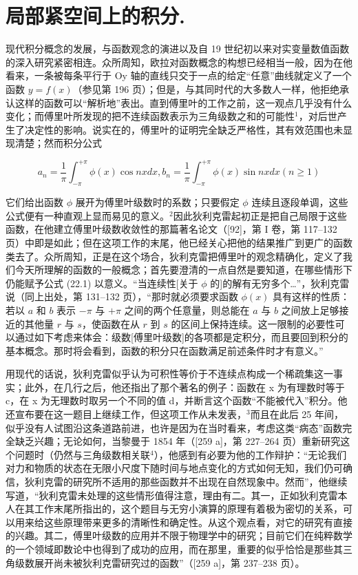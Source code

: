 \chapter{局部紧空间上的积分.}

现代积分概念的发展，与函数观念的演进以及自 19 世纪初以来对实变量数值函数的深入研究紧密相连。众所周知，欧拉对函数概念的构想已经相当一般，因为在他看来，一条被每条平行于 Oy 轴的直线只交于一点的给定“任意”曲线就定义了一个函数 \(y = f(x)\)（参见第 196 页）；但是，与其同时代的大多数人一样，他拒绝承认这样的函数可以“解析地”表出。直到傅里叶的工作之前，这一观点几乎没有什么变化；而傅里叶所发现的把不连续函数表示为三角级数之和的可能性\(^{1}\)，对后世产生了决定性的影响。说实在的，傅里叶的证明完全缺乏严格性，其有效范围也未显现清楚；然而积分公式

\[
a _ {n} = \frac {1}{\pi} \int_ {- \pi} ^ {+ \pi} \phi (x) \cos n x d x, b _ {n} = \frac {1}{\pi} \int_ {- \pi} ^ {+ \pi} \phi (x) \sin n x d x (n \geq 1)\tag{22.1}
\]

它们给出函数 \(\phi\) 展开为傅里叶级数时的系数；只要假定 \(\phi\) 连续且逐段单调，这些公式便有一种直观上显而易见的意义。\(^{2}\)因此狄利克雷起初正是把自己局限于这些函数，在他建立傅里叶级数收敛性的那篇著名论文（{[}92{]}，第 I 卷，第 117–132 页）中即是如此；但在这项工作的末尾，他已经关心把他的结果推广到更广的函数类去了。众所周知，正是在这个场合，狄利克雷把傅里叶的观念精确化，定义了我们今天所理解的函数的一般概念；首先要澄清的一点自然是要知道，在哪些情形下仍能赋予公式 (22.1) 以意义。“当连续性{[}关于 \(\phi\) 的{]}的解有无穷多个\ldots{}”，狄利克雷说（同上出处，第 131–132 页），“那时就必须要求函数 \(\phi(x)\) 具有这样的性质：若以 \(a\) 和 \(b\) 表示 \(-\pi\) 与 \(+\pi\) 之间的两个任意量，则总能在 \(a\) 与 \(b\) 之间放上足够接近的其他量 \(r\) 与 \(s\)，使函数在从 \(r\) 到 \(s\) 的区间上保持连续。这一限制的必要性可以通过如下考虑来体会：级数{[}傅里叶级数{]}的各项都是定积分，而且要回到积分的基本概念。那时将会看到，函数的积分只在函数满足前述条件时才有意义。”

用现代的话说，狄利克雷似乎认为可积性等价于不连续点构成一个稀疏集这一事实；此外，在几行之后，他还指出了那个著名的例子：函数在 x 为有理数时等于 c，在 x 为无理数时取另一个不同的值 d，并断言这个函数“不能被代入”积分。他还宣布要在这一题目上继续工作，但这项工作从未发表，\(^{3}\)而且在此后 25 年间，似乎没有人试图沿这条道路前进，也许是因为在当时看来，考虑这类“病态”函数完全缺乏兴趣；无论如何，当黎曼于 1854 年（{[}259 a{]}，第 227–264 页）重新研究这个问题时（仍然与三角级数相关联\(^{4}\)），他感到有必要为他的工作辩护：“无论我们对力和物质的状态在无限小尺度下随时间与地点变化的方式如何无知，我们仍可确信，狄利克雷的研究所不适用的那些函数并不出现在自然现象中。然而”，他继续写道，“狄利克雷未处理的这些情形值得注意，理由有二。其一，正如狄利克雷本人在其工作末尾所指出的，这个题目与无穷小演算的原理有着极为密切的关系，可以用来给这些原理带来更多的清晰性和确定性。从这个观点看，对它的研究有直接的兴趣。其二，傅里叶级数的应用并不限于物理学中的研究；目前它们在纯粹数学的一个领域即数论中也得到了成功的应用，而在那里，重要的似乎恰恰是那些其三角级数展开尚未被狄利克雷研究过的函数”（{[}259 a{]}，第 237–238 页）。


